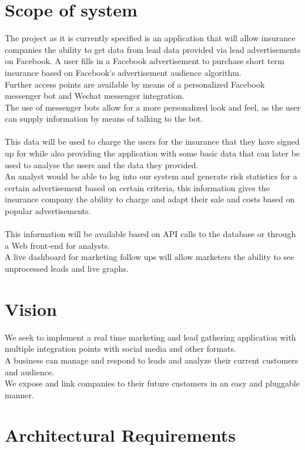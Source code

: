 \documentclass{article}
\begin{document}
\section{Scope of system}
The project as it is currently specified is an application that will allow insurance companies the ability to get data from lead data provided via lead advertisements on Facebook.
A user fills in a Facebook advertisement to purchase short term insurance based on Facebook's advertisement audience algorithm. \\
Further access points are available by means of a personalized Facebook messenger bot and Wechat messenger integration.\\ The use of messenger bots allow for a more personalized look and feel, as the user can supply information by means of talking to the bot. \\ \\
This data will be used to charge the users for the insurance that they have signed up for while also providing the application with some basic data that can later be used to analyse the users and the data they provided. \\
An analyst would be able to log into our system and generate risk statistics for a certain advertisement based on certain criteria, this information gives the insurance company the ability to charge and adapt their sale and costs based on popular advertisements.\\ \\
This information will be available based on API calls to the database or through a Web front-end for analysts.\\
A live dashboard for marketing follow ups will allow marketers the ability to see unprocessed leads and live graphs.


\section{Vision}
We seek to implement a real time marketing and lead gathering application with multiple integration points with social media and other formats.  \\
A business can manage and respond to leads and analyze their current customers and audience. \\ 
We expose and link companies to their future customers in an easy and pluggable manner.

\pagebreak

\section{Architectural Requirements}
\end{document}
